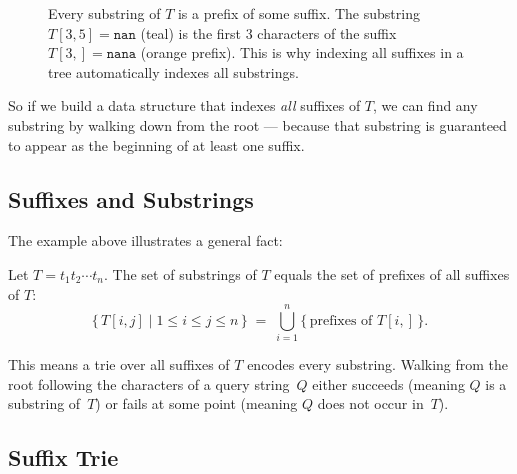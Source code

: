 \begin{figure}[H]
\caption{%
  Every substring of $T$ is a prefix of some suffix.
  The substring $T[3,5] = \texttt{nan}$
  (\textcolor{teal!50!black}{teal}) is the first 3 characters of the
  suffix $T[3{,}] = \texttt{nana}$
  (\textcolor{orange!50!black}{orange prefix}).
  This is why indexing all suffixes in a tree automatically indexes all
  substrings.
}
\label{fig:substring-prefix-suffix}
\end{figure}

So if we build a data structure that indexes \emph{all} suffixes of $T$,
we can find any substring by walking down from the root --- because that
substring is guaranteed to appear as the beginning of at least one suffix.

\subsection{Suffixes and Substrings}

The example above illustrates a general fact:

\begin{observation}
  Let $T = t_1 t_2 \cdots t_n$.
  The set of substrings of $T$ equals the set of prefixes of all suffixes
  of $T$:
  \[
    \bigl\{\, T[i,j] \mid 1 \le i \le j \le n \,\bigr\}
    \;=\;
    \bigcup_{i=1}^{n}
    \bigl\{\,\text{prefixes of } T[i{,}] \,\bigr\}.
  \]
\end{observation}

This means a trie over all suffixes of $T$ encodes every substring.
Walking from the root following the characters of a query string~$Q$
either succeeds (meaning $Q$ is a substring of~$T$) or fails at some
point (meaning $Q$ does not occur in~$T$).

\subsection{Suffix Trie}


